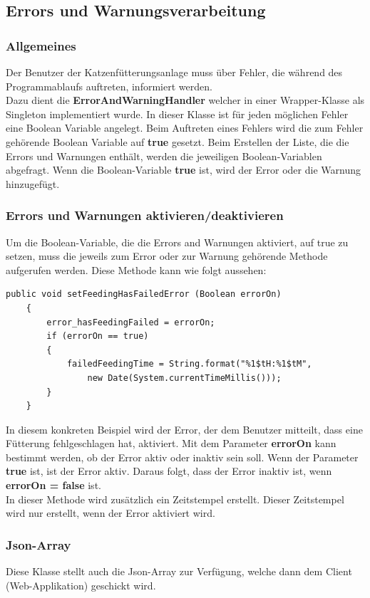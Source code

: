 \subsection{Errors und Warnungsverarbeitung}
\subsubsection{Allgemeines}
Der Benutzer der Katzenfütterungsanlage muss über Fehler, die während des Programmablaufs auftreten, informiert werden. 
\\ Dazu dient die \textbf{ErrorAndWarningHandler} welcher in einer Wrapper-Klasse als Singleton implementiert wurde. In dieser Klasse ist für jeden möglichen Fehler eine Boolean Variable angelegt. Beim Auftreten eines Fehlers wird die zum Fehler gehörende Boolean Variable auf \textbf{true} gesetzt. Beim Erstellen der Liste, die die Errors und Warnungen enthält, werden die jeweiligen Boolean-Variablen abgefragt. Wenn die Boolean-Variable \textbf{true} ist, wird der Error oder die Warnung hinzugefügt. 

\newpage

\subsubsection{Errors und Warnungen aktivieren/deaktivieren}
Um die Boolean-Variable, die die Errors and Warnungen aktiviert, auf true zu setzen, muss die jeweils zum Error oder zur Warnung gehörende Methode aufgerufen werden. Diese Methode kann wie folgt aussehen:
\begin{lstlisting}[style=JavaStyle, caption=Error setzen]
public void setFeedingHasFailedError (Boolean errorOn)
    {
        error_hasFeedingFailed = errorOn;
        if (errorOn == true)
        {
            failedFeedingTime = String.format("%1$tH:%1$tM", 
            	new Date(System.currentTimeMillis()));
        }   
    }
\end{lstlisting}
In diesem konkreten Beispiel wird der Error, der dem Benutzer mitteilt, dass eine Fütterung fehlgeschlagen hat, aktiviert. Mit dem Parameter \textbf{errorOn} kann bestimmt werden, ob der Error aktiv oder inaktiv sein soll. Wenn der Parameter \textbf{true} ist, ist der Error aktiv. Daraus folgt, dass der Error inaktiv ist, wenn \textbf{errorOn = false} ist. 
\\ In dieser Methode wird zusätzlich ein Zeitstempel erstellt. Dieser Zeitstempel wird nur erstellt, wenn der Error aktiviert wird. 

\subsubsection{Json-Array} \label{subsubsec:Array}
Diese Klasse stellt auch die Json-Array zur Verfügung, welche dann dem Client (Web-Applikation) geschickt wird. 


